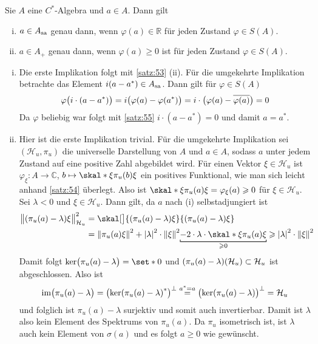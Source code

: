 \begin{korollar}[{name=[selbstadjungiert und positiv mittels Zuständen]},label=korr:514]
	Sie $A$ eine $C^*$-Algebra und $a \in A$.
	Dann gilt
	\begin{enumerate}[(i),itemsep=0pt]
		\item $a \in A_{\sa}$ genau dann, wenn $\varphi(a) \in \mathbb{R}$ für jeden Zustand $\varphi \in S(A)$.
		\item $a \in A_+$ genau dann, wenn $\varphi(a) \ge 0$ ist für jeden Zustand $\varphi \in S(A)$.
	\end{enumerate}
\end{korollar}
\begin{beweis}
	\leavevmode
	\begin{enumerate}[(i)]
		\item Die erste Implikation folgt mit \autoref{satz:53} (ii).
		Für die umgekehrte Implikation betrachte das Element $i(a-a^*) \in A_{\sa}$. Dann gilt für $\varphi \in S(A)$
		\[
			\varphi \enbrace[\big]{i \cdot (a- a^*)} = i \enbrace[\big]{\varphi(a) - \varphi(a^*)} = i \cdot  \enbrace[\big]{\varphi(a) - \overline{\varphi(a)}} =0
		\]
		Da $\varphi$ beliebig war folgt mit \autoref{satz:55} $i \cdot (a-a^*)=0$ und damit $a=a^*$.
		\item Hier ist die erste Implikation trivial. 
		Für die umgekehrte Implikation sei $(\mathcal{H}_u,\pi_u)$ die universelle Darstellung von $A$ und $a \in A$, sodass $a$ unter jedem Zustand auf eine positive Zahl abgebildet wird. 
		Für einen Vektor $\xi \in \mathcal{H}_u$ ist $\varphi_\xi \colon A \to \mathbb{C}$, $b \mapsto \skal*{\xi}{\pi_u(b)\xi}$ ein positives Funktional, wie man sich leicht anhand \autoref{satz:54} überlegt.
		Also ist $\skal*{\xi}{\pi_u(a)\xi}=  \varphi_\xi(a)\ge 0$ für $\xi \in \mathcal{H}_u$.
		Sei $\lambda<0$ und $\xi\in \mathcal{H}_u$.
		Dann gilt, da $a$ nach (i) selbstadjungiert ist
		\begin{align}
			\norm[\big]{\enbrace*{\pi_u(a)-\lambda} \xi}^2_{\mathcal{H}_u} &= \skal[\big]{\enbrace*{\pi_u(a)-\lambda}\xi}{ \enbrace*{\pi_u(a)-\lambda}\xi} \\
			&= \norm*{\pi_u(a)\xi}^2 + \abs*{\lambda}^2 \cdot \norm*{\xi}^2 \Underbracket{- 2 \cdot \lambda \cdot \skal*{\xi}{\pi_u(a)\xi}}{\ge 0} \ge \abs*{\lambda}^2 \cdot \norm*{\xi}^2 
		\end{align}
		Damit folgt $\ker \enbrace[\big]{\pi_u(a)-\lambda}= \set*{0}$ und $\enbrace*{\pi_u(a)-\lambda}(\mathcal{H}_u) \subset \mathcal{H}_u$ ist abgeschlossen.
		Also ist 
		\[
			\im \enbrace[\big]{\pi_u(a)-\lambda} = \enbrace[\big]{\ker \enbrace*{\pi_u(a)-\lambda}^*}^\bot \stackrel{a^*=a}{=} \enbrace[\big]{\ker \enbrace*{\pi_u(a)-\lambda}}^\bot = \mathcal{H}_u
		\]
		und folglich ist $\pi_u(a)-\lambda$ surjektiv und somit auch invertierbar.  
		Damit ist $\lambda$ also kein Element des Spektrums von $\pi_u(a)$. 
		Da $\pi_u$ isometrisch ist, ist $\lambda$ auch kein Element von $\sigma(a)$ und es folgt $a \ge 0$ wie gewünscht.\qedhere
	\end{enumerate}
\end{beweis}

